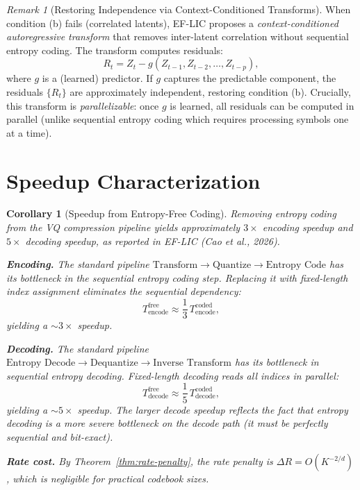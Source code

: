 \documentclass[11pt,a4paper]{article}
\newtheorem{corollary}[theorem]{Corollary}
\theoremstyle{definition}
\theoremstyle{remark}
\newtheorem{remark}[theorem]{Remark}
\begin{document}
\begin{remark}[Restoring Independence via Context-Conditioned Transforms]
\label{rem:decorrelation}
When condition (b) fails (correlated latents), EF-LIC proposes a
\emph{context-conditioned autoregressive transform} that removes
inter-latent correlation without sequential entropy coding. The transform
computes residuals:
\[
R_t = Z_t - g(Z_{t-1}, Z_{t-2}, \ldots, Z_{t-p}),
\]
where $g$ is a (learned) predictor. If $g$ captures the predictable
component, the residuals $\{R_t\}$ are approximately independent, restoring
condition (b). Crucially, this transform is \emph{parallelizable}: once $g$
is learned, all residuals can be computed in parallel (unlike sequential
entropy coding which requires processing symbols one at a time).
\end{remark}

\section{Speedup Characterization}

\begin{corollary}[Speedup from Entropy-Free Coding]
\label{cor:speedup}
Removing entropy coding from the VQ compression pipeline yields approximately
$3\times$ encoding speedup and $5\times$ decoding speedup, as reported in
EF-LIC (Cao et al., 2026).

\textbf{Encoding.} The standard pipeline
$\text{Transform} \to \text{Quantize} \to \text{Entropy Code}$
has its bottleneck in the sequential entropy coding step. Replacing it with
fixed-length index assignment eliminates the sequential dependency:
\[
T_{\mathrm{encode}}^{\mathrm{free}} \approx \frac{1}{3}\, T_{\mathrm{encode}}^{\mathrm{coded}},
\]
yielding a $\sim 3\times$ speedup.

\textbf{Decoding.} The standard pipeline
$\text{Entropy Decode} \to \text{Dequantize} \to \text{Inverse Transform}$
has its bottleneck in sequential entropy decoding. Fixed-length decoding
reads all indices in parallel:
\[
T_{\mathrm{decode}}^{\mathrm{free}} \approx \frac{1}{5}\, T_{\mathrm{decode}}^{\mathrm{coded}},
\]
yielding a $\sim 5\times$ speedup. The larger decode speedup reflects the
fact that entropy decoding is a more severe bottleneck on the decode path
(it must be perfectly sequential and bit-exact).

\textbf{Rate cost.} By Theorem~\ref{thm:rate-penalty}, the rate penalty is
$\Delta R = O(K^{-2/d})$, which is negligible for practical codebook sizes.
\end{corollary}
\end{document}
